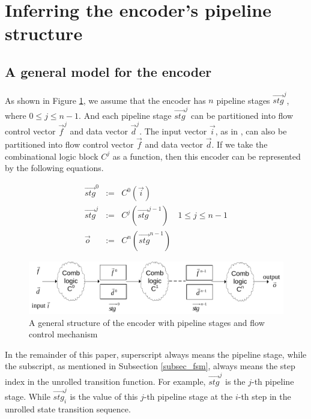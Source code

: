 \documentclass[runningheads,a4paper,orivec]{llncs}
\begin{document}
\section{Inferring the encoder's pipeline structure}\label{sec_pipeinfer}

\subsection{A general model for the encoder}
As shown in Figure \ref{fig_pipeenc},
we assume that 
the encoder has $n$ pipeline stages $\vec{stg}^j$,
where $0\le j \le n-1$.
And each pipeline stage $\vec{stg}^j$ can be partitioned into flow control vector $\vec{f}^j$ and data vector $\vec{d}^j$.
The input vector $\vec{i}$,
as in \cite{QinTODAES15},
can also be partitioned into flow control vector $\vec{f}$ and data vector $\vec{d}$.
If we take the combinational logic block $C^j$ as a function,
then this encoder can be represented by the following equations.

\begin{equation}\label{equ_genpipe}
\begin{array}{cccc}
\vec{stg}^0   & := & C^0(\vec{i})         &\\
\vec{stg}^j   & := & C^j(\vec{stg}^{j-1}) & 1\le j\le n-1\\
\vec{o}       & := & C^n(\vec{stg}^{n-1}) &
\end{array}
\end{equation}


\begin{figure}[b]
\begin{center}
\includegraphics[width=\textwidth]{pipemod1}
\end{center}
\caption{A general structure of the encoder with pipeline stages and flow control mechanism}
  \label{fig_pipeenc}
\end{figure}



In the remainder of this paper,
superscript always means the pipeline stage,
while the subscript,
as mentioned in Subsection \ref{subsec_fsm},
always means the step index in the unrolled transition function.
For example,
$\vec{stg}^j$ is the $j$-th pipeline stage.
While $\vec{stg}^j_i$ is the value of this $j$-th pipeline stage 
at the $i$-th step in the unrolled state transition sequence.
\end{document}
